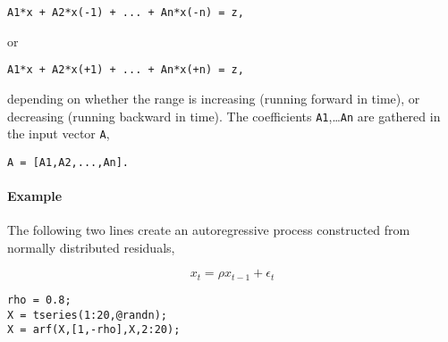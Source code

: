 \begin{verbatim}
A1*x + A2*x(-1) + ... + An*x(-n) = z,
\end{verbatim}

or

\begin{verbatim}
A1*x + A2*x(+1) + ... + An*x(+n) = z,
\end{verbatim}

depending on whether the range is increasing (running forward in time),
or decreasing (running backward in time). The coefficients
\texttt{A1},\ldots{}\texttt{An} are gathered in the input vector
\texttt{A},

\begin{verbatim}
A = [A1,A2,...,An].
\end{verbatim}

\paragraph{Example}

The following two lines create an autoregressive process constructed
from normally distributed residuals,

\[ x_t = \rho x_{t-1} + \epsilon_t \]

\begin{verbatim}
rho = 0.8;
X = tseries(1:20,@randn);
X = arf(X,[1,-rho],X,2:20);
\end{verbatim}


